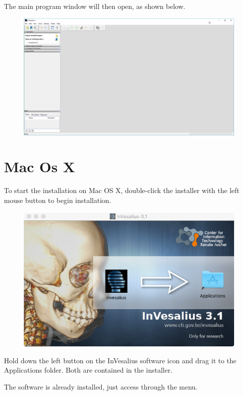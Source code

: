\hspace{.2cm}

The main program window will then open, as shown below.

\begin{figure}[!htb]
\centering
\includegraphics[scale=0.3]{../user_guide_figures/invesalius_screen/main_window_without_project_en.png}
\end{figure}

\section{Mac Os X}

To start the installation on Mac OS X, double-click the installer with the left mouse button to begin installation.

\begin{figure}[!htb]
\centering
\includegraphics[scale=0.4]{../user_guide_figures/invesalius_screen/mac2.png}
\end{figure}

Hold down the left button on the InVesalius software icon and drag it to the Applications folder. Both are contained in the installer.


The software is already installed, just access through the menu.